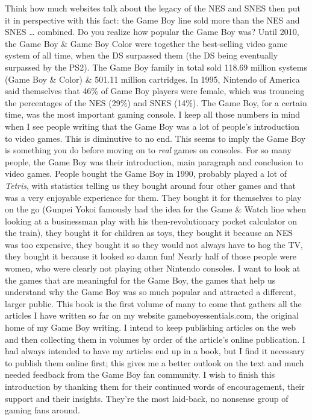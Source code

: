 \documentclass{book}
\begin{document}
Think how much websites talk about the legacy of the NES and SNES then put it in perspective with this fact: the Game Boy line sold more than the NES and SNES … combined. Do you realize how popular the Game Boy was? Until 2010, the Game Boy \& Game Boy Color were together the best-selling video game system of all time, when the DS surpassed them (the DS being eventually surpassed by the PS2). The Game Boy family in total sold 118.69 million systems (Game Boy \& Color) \& 501.11 million cartridges. In 1995, Nintendo of America said themselves that 46\% of Game Boy players were female, which was trouncing the percentages of the NES (29\%) and SNES (14\%). The Game Boy, for a certain time, was the most important gaming console.
I keep all those numbers in mind when I see people writing that the Game Boy was a lot of people’s introduction to video games. This is diminutive to no end. This seems to imply the Game Boy is something you do before moving on to \emph{real} games on consoles. For so many people, the Game Boy was their introduction, main paragraph and conclusion to video games. People bought the Game Boy in 1990, probably played a lot of \emph{Tetris}, with statistics telling us they bought around four other games and that was a very enjoyable experience for them. They bought it for themselves to play on the go (Gunpei Yokoi famously had the idea for the Game \& Watch line when looking at a businessman play with his then-revolutionary pocket calculator on the train), they bought it for children as toys, they bought it because an NES was too expensive, they bought it so they would not always have to hog the TV, they bought it because it looked so damn fun! Nearly half of those people were women, who were clearly not playing other Nintendo consoles. I want to look at the games that are meaningful for the Game Boy, the games that help us understand why the Game Boy was so much popular and attracted a different, larger public.
This book is the first volume of many to come that gathers all the articles I have written so far on my website gameboyessentials.com, the original home of my Game Boy writing. I intend to keep publishing articles on the web and then collecting them in volumes by order of the article’s online publication. I had always intended to have my articles end up in a book, but I find it necessary to publish them online first; this gives me a better outlook on the text and much needed feedback from the Game Boy fan community. I wish to finish this introduction by thanking them for their continued words of encouragement, their support and their insights. They’re the most laid-back, no nonsense group of gaming fans around.
\end{document}
